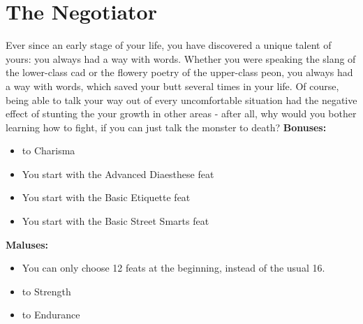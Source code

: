 \section{The Negotiator}
Ever since an early stage of your life, you have discovered a unique talent of yours: you always had a way with words. Whether you were speaking the slang of the lower-class cad or the flowery poetry of the upper-class peon, you always had a way with words, which saved your butt several times in your life. Of course, being able to talk your way out of every uncomfortable situation had the negative effect of stunting the your growth in other areas - after all, why would you bother learning how to fight, if you can just talk the monster to death?\newline
\textbf{Bonuses:}
\begin{itemize}
	\item {} to Charisma
	\item You start with the Advanced Diaesthese feat
	\item You start with the Basic Etiquette feat
	\item You start with the Basic Street Smarts feat
\end{itemize}
\textbf{Maluses:}
\begin{itemize}
	\item You can only choose 12 feats at the beginning, instead of the usual 16.
	\item {} to Strength
	\item {} to Endurance
\end{itemize}
